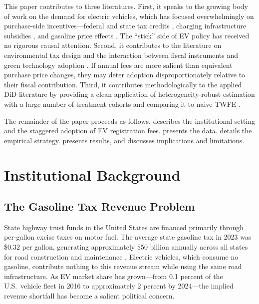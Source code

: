 \documentclass[12pt]{article}
\begin{document}
This paper contributes to three literatures. First, it speaks to the growing body of work on the demand for electric vehicles, which has focused overwhelmingly on purchase-side incentives---federal and state tax credits \citep{clinton2019providing, archsmith2022incentives, xing2021consumer}, charging infrastructure subsidies \citep{li2017market, springel2021network}, and gasoline price effects \citep{bushnell2022fleet}. The ``stick'' side of EV policy has received no rigorous causal attention. Second, it contributes to the literature on environmental tax design and the interaction between fiscal instruments and green technology adoption \citep{gillingham2018cost, levinson2019energy}. If annual fees are more salient than equivalent purchase price changes, they may deter adoption disproportionately relative to their fiscal contribution. Third, it contributes methodologically to the applied DiD literature by providing a clean application of heterogeneity-robust estimation with a large number of treatment cohorts and comparing it to naive TWFE \citep{roth2023whats, baker2025did}.

The remainder of the paper proceeds as follows.  describes the institutional setting and the staggered adoption of EV registration fees.  presents the data.  details the empirical strategy.  presents results, and  discusses implications and limitations.

\section{Institutional Background}
\label{sec:background}

\subsection{The Gasoline Tax Revenue Problem}

State highway trust funds in the United States are financed primarily through per-gallon excise taxes on motor fuel. The average state gasoline tax in 2023 was \$0.32 per gallon, generating approximately \$50 billion annually across all states for road construction and maintenance \citep{davis2019transportation}. Electric vehicles, which consume no gasoline, contribute nothing to this revenue stream while using the same road infrastructure. As EV market share has grown---from 0.1 percent of the U.S.\ vehicle fleet in 2016 to approximately 2 percent by 2024---the implied revenue shortfall has become a salient political concern.
\end{document}
